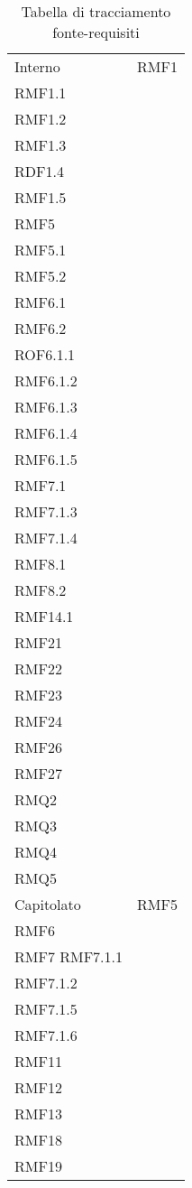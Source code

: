 \setlength{\tabcolsep}{10pt}
\begin{longtable}[h!] { >{\centering}m{5cm} >{\centering}m{5cm} }
	\caption{Tabella di tracciamento fonte-requisiti} \\
	\rowcolor{lightgray}
	\thead{Fonte} & \thead{Requisiti} \\ \endhead%


	 Interno & RMF1 \\
	 RMF1.1 \\
	 RMF1.2 \\
	 RMF1.3 \\
	 RDF1.4 \\
	 RMF1.5 \\
	 RMF5 \\
	 RMF5.1 \\
	 RMF5.2 \\
	 RMF6.1 \\
	 RMF6.2 \\
	 ROF6.1.1 \\
	 RMF6.1.2 \\
	 RMF6.1.3 \\
	 RMF6.1.4 \\
	 RMF6.1.5 \\
	 RMF7.1 \\
	 RMF7.1.3 \\
	 RMF7.1.4 \\
	 RMF8.1 \\
	 RMF8.2 \\
	 RMF14.1 \\
	 RMF21 \\
	 RMF22 \\
	 RMF23 \\
	 RMF24 \\
	 RMF26 \\
	 RMF27 \\
	 RMQ2 \\
	 RMQ3 \\
	 RMQ4 \\
	 RMQ5
	 \tabularnewline
	 Capitolato & RMF5 \\
	 RMF6 \\
	 RMF7
	 RMF7.1.1\\
	 RMF7.1.2 \\
	 RMF7.1.5 \\
	 RMF7.1.6 \\
	 RMF11 \\
	 RMF12 \\
	 RMF13 \\
	 RMF18 \\
	 RMF19 \\

\end{longtable}
